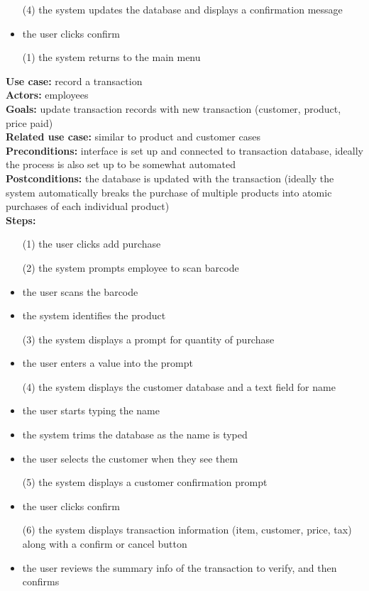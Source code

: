 \documentclass[notitlepage, 11pt]{report}
\begin{document}
\begin{enumerate}[itemindent=-1.5em]
\begin{itemize}
		\item[(4)] the system updates the database and displays a confirmation message
		\item the user clicks confirm 
		\item[(1)] the system returns to the main menu
		\end{itemize}
	\textbf{Use case:} record a transaction\\
	\textbf{Actors:} employees\\
	\textbf{Goals:} update transaction records with new transaction (customer, product, price paid)\\
	\textbf{Related use case:} similar to product and customer cases\\
	\textbf{Preconditions:} interface is set up and connected to transaction database, ideally the process is also set up to be somewhat automated\\
	\textbf{Postconditions:} the database is updated with the transaction (ideally the system automatically breaks the purchase of multiple products into atomic purchases of each individual product)\\
	\textbf{Steps:} 
		\begin{itemize}
		\item[(1)] the user clicks add purchase
		\item[(2)] the system prompts employee to scan barcode
		\item the user scans the barcode 
		\item the system identifies the product
		\item[(3)] the system displays a prompt for quantity of purchase
		\item the user enters a value into the prompt
		\item[(4)] the system displays the customer database and a text field for name
		\item the user starts typing the name
		\item the system trims the database as the name is typed
		\item the user selects the customer when they see them
		\item[(5)] the system displays a customer confirmation prompt
		\item the user clicks confirm
		\item[(6)] the system displays transaction information (item, customer, price, tax) along with a confirm or cancel button
		\item the user reviews the summary info of the transaction to verify, and then confirms

\end{itemize}
\end{enumerate}
\end{document}
